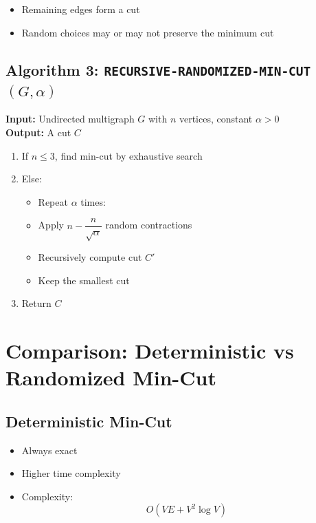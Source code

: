 \documentclass[11pt]{article}
\begin{document}
\begin{itemize}
    \item Remaining edges form a cut
    \item Random choices may or may not preserve the minimum cut
\end{itemize}

\subsection*{Algorithm 3: \texttt{RECURSIVE-RANDOMIZED-MIN-CUT$(G,\alpha)$}}

\textbf{Input:} Undirected multigraph $G$ with $n$ vertices, constant $\alpha > 0$ \\
\textbf{Output:} A cut $C$

\begin{enumerate}
    \item If $n \le 3$, find min-cut by exhaustive search
    \item Else:
    \begin{itemize}
        \item Repeat $\alpha$ times:
        \item Apply $n - \dfrac{n}{\sqrt{\alpha}}$ random contractions
        \item Recursively compute cut $C'$
        \item Keep the smallest cut
    \end{itemize}
    \item Return $C$
\end{enumerate}


\section{Comparison: Deterministic vs Randomized Min-Cut}

\subsection*{Deterministic Min-Cut}

\begin{itemize}
    \item Always exact
    \item Higher time complexity
    \item Complexity:
    \[
    O(VE + V^2 \log V)
    \]
\end{itemize}
\end{document}
